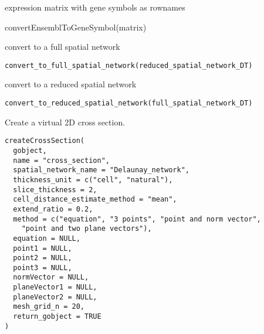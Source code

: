 \documentclass[a4paper]{book}
\begin{document}
%
\begin{Value}
expression matrix with gene symbols as rownames
\end{Value}
%
\begin{Examples}
\begin{ExampleCode}
    convertEnsemblToGeneSymbol(matrix)
\end{ExampleCode}
\end{Examples}
%
\begin{Description}\relax
convert to a full spatial network
\end{Description}
%
\begin{Usage}
\begin{verbatim}
convert_to_full_spatial_network(reduced_spatial_network_DT)
\end{verbatim}
\end{Usage}
%
\begin{Description}\relax
convert to a reduced spatial network
\end{Description}
%
\begin{Usage}
\begin{verbatim}
convert_to_reduced_spatial_network(full_spatial_network_DT)
\end{verbatim}
\end{Usage}
%
\begin{Description}\relax
Create a virtual 2D cross section.
\end{Description}
%
\begin{Usage}
\begin{verbatim}
createCrossSection(
  gobject,
  name = "cross_section",
  spatial_network_name = "Delaunay_network",
  thickness_unit = c("cell", "natural"),
  slice_thickness = 2,
  cell_distance_estimate_method = "mean",
  extend_ratio = 0.2,
  method = c("equation", "3 points", "point and norm vector",
    "point and two plane vectors"),
  equation = NULL,
  point1 = NULL,
  point2 = NULL,
  point3 = NULL,
  normVector = NULL,
  planeVector1 = NULL,
  planeVector2 = NULL,
  mesh_grid_n = 20,
  return_gobject = TRUE
)
\end{verbatim}
\end{Usage}
\end{document}
